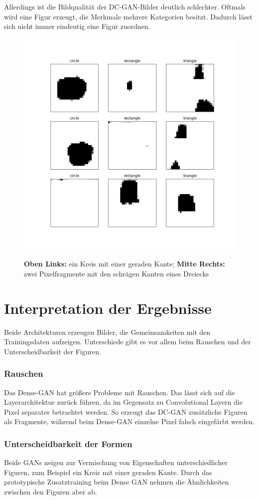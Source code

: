 Allerdings ist die Bildqualität der DC-GAN-Bilder deutlich schlechter.
Oftmals wird eine Figur erzeugt, die Merkmale mehrere Kategorien besitzt.
Dadurch lässt sich nicht immer eindeutig eine Figur zuordnen.

\begin{figure}[H]
	\centering
	\includegraphics[width=0.45\linewidth]{kapitel/5_ergebnisse/dcgan/fid_circle.png}
	\label{ergebnis:dcgan-fid-zusammenfassung}
	\caption[]{\textbf{Oben Links:} ein Kreis mit einer geraden Kante; \textbf{Mitte Rechts:} zwei Pixelfragmente mit den schrägen Kanten eines Dreiecks}
\end{figure}


\section{Interpretation der Ergebnisse}
Beide Architekturen erzeugen Bilder, die Gemeinsamkeiten mit den Trainingsdaten aufzeigen.
Unterschiede gibt es vor allem beim Rauschen und der Unterscheidbarkeit der Figuren.

\subsubsection{Rauschen}
Das Dense-GAN hat größere Probleme mit Rauschen.
Das lässt sich auf die Layerarchitektur zurück führen, da im Gegensatz zu Convolutional Layern die Pixel separater betrachtet werden.
So erzeugt das DC-GAN zusätzliche Figuren als Fragmente, während beim Dense-GAN einzelne Pixel falsch eingefärbt werden.

\subsubsection{Unterscheidbarkeit der Formen}
Beide GANs neigen zur Vermischung von Eigenschaften unterschiedlicher Figuren, zum Beispiel ein Kreis mit einer geraden Kante.
Durch das prototypische Zusatztraining beim Dense GAN nehmen die Ähnlichkeiten zwischen den Figuren aber ab.

